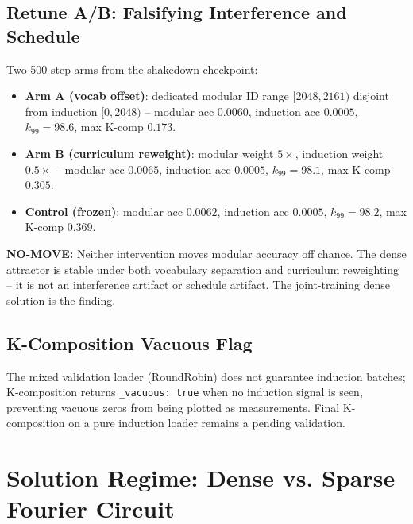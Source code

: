 \documentclass[11pt]{article}
\begin{document}
\subsection{Retune A/B: Falsifying Interference and Schedule}
Two 500-step arms from the shakedown checkpoint:
\begin{itemize}
  \item \textbf{Arm A (vocab offset)}: dedicated modular ID range
    $[2048, 2161)$ disjoint from induction $[0, 2048)$ -- modular acc
    $0.0060$, induction acc $0.0005$, $k_{99}=98.6$, max K-comp $0.173$.
  \item \textbf{Arm B (curriculum reweight)}: modular weight $5\times$,
    induction weight $0.5\times$ -- modular acc $0.0065$, induction acc
    $0.0005$, $k_{99}=98.1$, max K-comp $0.305$.
  \item \textbf{Control (frozen)}: modular acc $0.0062$, induction acc
    $0.0005$, $k_{99}=98.2$, max K-comp $0.369$.
\end{itemize}
\textbf{NO-MOVE:} Neither intervention moves modular accuracy off chance.
The dense attractor is stable under both vocabulary separation and
curriculum reweighting -- it is not an interference artifact or schedule
artifact. The joint-training dense solution is the finding.

\subsection{K-Composition Vacuous Flag}
The mixed validation loader (RoundRobin) does not guarantee induction
batches; K-composition returns \texttt{\_vacuous: true} when no induction
signal is seen, preventing vacuous zeros from being plotted as
measurements. Final K-composition on a pure induction loader remains a
pending validation.

\section{Solution Regime: Dense vs. Sparse Fourier Circuit}
\label{sec:phase-diagram}
\end{document}
